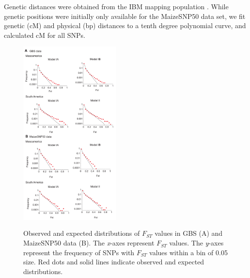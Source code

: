 Genetic distances were obtained from the IBM mapping population \cite[]{Ganal_2011_22174790}.  
While genetic positions were initially only available for the MaizeSNP50 data set, we fit genetic (cM) and physical (bp) distances to a tenth degree polynomial curve, and calculated cM for all SNPs. 
 



\begin{figure}[tb]   
  \begin{center}
   \vspace{-0mm}
   \includegraphics[width=0.45\textwidth]{fig/Fig5}
   \renewcommand{\baselinestretch}{0.9}
   \vspace{-3mm}
   \caption{Observed and expected distributions of $F_{ST}$ values in GBS (A) and MaizeSNP50 data (B).  The \emph{x}-axes represent $F_{ST}$ values.  The \emph{y}-axes represent the frequency of SNPs with $F_{ST}$ values within a bin of 0.05 size.  Red dots and solid lines indicate observed and expected distributions. %
   }
\vspace{-6mm}
    \label{FstDist}
  \end{center}
\end{figure}


